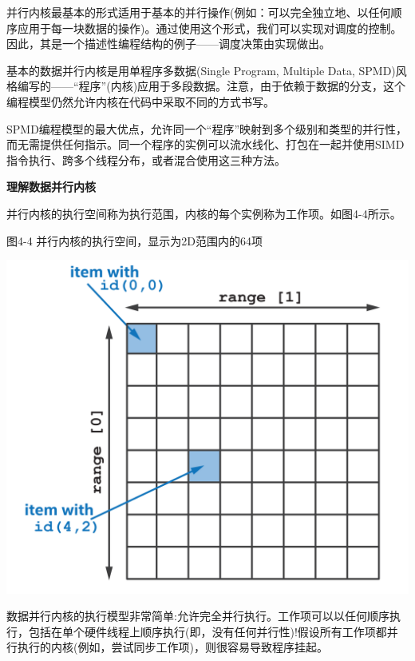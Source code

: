 并行内核最基本的形式适用于基本的并行操作(例如：可以完全独立地、以任何顺序应用于每一块数据的操作)。通过使用这个形式，我们可以实现对调度的控制。因此，其是一个描述性编程结构的例子——调度决策由实现做出。\par

基本的数据并行内核是用单程序多数据(Single Program, Multiple Data, SPMD)风格编写的——“程序”(内核)应用于多段数据。注意，由于依赖于数据的分支，这个编程模型仍然允许内核在代码中采取不同的方式书写。\par

SPMD编程模型的最大优点，允许同一个“程序”映射到多个级别和类型的并行性，而无需提供任何指示。同一个程序的实例可以流水线化、打包在一起并使用SIMD指令执行、跨多个线程分布，或者混合使用这三种方法。\par

\hspace*{\fill} \par %
\textbf{理解数据并行内核}

并行内核的执行空间称为执行范围，内核的每个实例称为工作项。如图4-4所示。\par

\hspace*{\fill} \par %
图4-4 并行内核的执行空间，显示为2D范围内的64项
\begin{center}
	\includegraphics[width=1.\textwidth]{content/chapter-4/images/3}
\end{center}

数据并行内核的执行模型非常简单:允许完全并行执行。工作项可以以任何顺序执行，包括在单个硬件线程上顺序执行(即，没有任何并行性)!假设所有工作项都并行执行的内核(例如，尝试同步工作项)，则很容易导致程序挂起。\par

